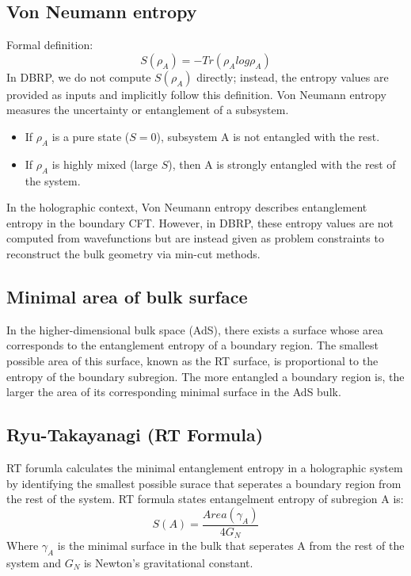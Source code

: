 \documentclass[12pt]{article}
\begin{document}
    \subsection{Von Neumann entropy}
        Formal definition:
        \[
            S(\rho_A) = -Tr(\rho_{A}log\rho_A)
        \]
        \hspace{0.5cm} In DBRP, we do not compute $S(\rho_A)$ directly; instead, the entropy values are provided as inputs and implicitly follow this definition. Von Neumann entropy measures the uncertainty or entanglement of a subsystem.
        \begin{itemize}
            \item If $\rho_A$ is a pure state ($S=0$), subsystem A is not entangled with the rest.
            \item If $\rho_A$ is highly mixed (large $S$), then A is strongly entangled with the rest of the system.
        \end{itemize}

        In the holographic context, Von Neumann entropy describes entanglement entropy in the boundary CFT. However, in DBRP, these entropy values are not computed from wavefunctions but are instead given as problem constraints to reconstruct the bulk geometry via min-cut methods.
    
    \subsection{Minimal area of bulk surface}
        \hspace{0.5cm} In the higher-dimensional bulk space (AdS), there exists a surface whose area corresponds to the entanglement entropy of a boundary region. The smallest possible area of this surface, known as the RT surface, is proportional to the entropy of the boundary subregion. The more entangled a boundary region is, the larger the area of its corresponding minimal surface in the AdS bulk.        

    \subsection{Ryu-Takayanagi (RT Formula)}
        \hspace{0.5cm} RT forumla calculates the minimal entanglement entropy in a holographic system by identifying the smallest possible surace that seperates a boundary region from the rest of the system. RT formula states entangelment entropy of subregion A is:
        \[
            S(A) = \frac{Area(\gamma_A)}{4G_N}
        \]
        \hspace{0.5cm}Where $\gamma_A$ is the minimal surface in the bulk that seperates A from the rest of the system and $G_N$ is Newton's gravitational constant.
        \\
        \vspace{0.3cm}
\end{document}
